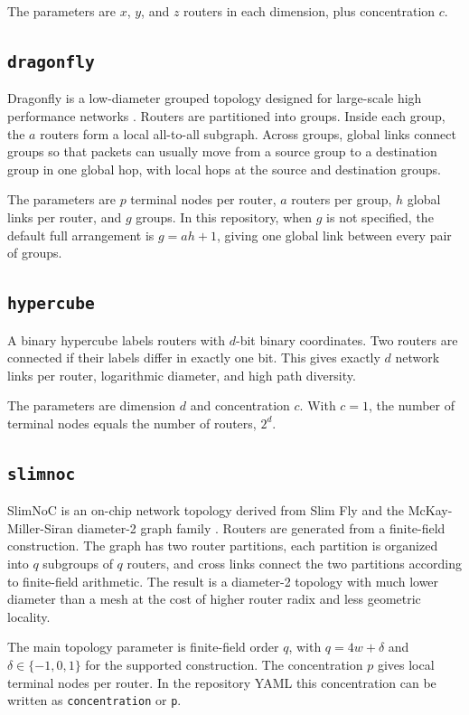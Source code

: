 \documentclass[11pt]{article}
\newcommand{\toponame}[1]{\texttt{#1}}
\begin{document}
The parameters are $x$, $y$, and $z$ routers in each dimension, plus
concentration $c$.

\subsection{\toponame{dragonfly}}

Dragonfly is a low-diameter grouped topology designed for large-scale high
performance networks \cite{kim2008dragonfly}. Routers are partitioned into
groups. Inside each group, the $a$ routers form a local all-to-all subgraph.
Across groups, global links connect groups so that packets can usually move
from a source group to a destination group in one global hop, with local hops
at the source and destination groups.

The parameters are $p$ terminal nodes per router, $a$ routers per group, $h$
global links per router, and $g$ groups. In this repository, when $g$ is not
specified, the default full arrangement is $g=ah+1$, giving one global link
between every pair of groups.

\subsection{\toponame{hypercube}}

A binary hypercube labels routers with $d$-bit binary coordinates. Two routers
are connected if their labels differ in exactly one bit. This gives exactly
$d$ network links per router, logarithmic diameter, and high path diversity.

The parameters are dimension $d$ and concentration $c$. With $c=1$, the number
of terminal nodes equals the number of routers, $2^d$.

\subsection{\toponame{slimnoc}}

SlimNoC is an on-chip network topology derived from Slim Fly and the
McKay-Miller-Siran diameter-2 graph family \cite{besta2020slimnoc}. Routers
are generated from a finite-field construction. The graph has two router
partitions, each partition is organized into $q$ subgroups of $q$ routers, and
cross links connect the two partitions according to finite-field arithmetic.
The result is a diameter-2 topology with much lower diameter than a mesh at
the cost of higher router radix and less geometric locality.

The main topology parameter is finite-field order $q$, with
$q=4w+\delta$ and $\delta \in \{-1,0,1\}$ for the supported construction.
The concentration $p$ gives local terminal nodes per router. In the repository
YAML this concentration can be written as \texttt{concentration} or \texttt{p}.
\end{document}
